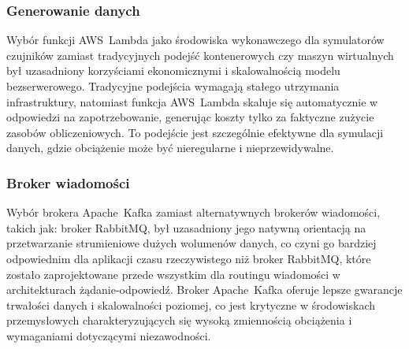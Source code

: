 \subsubsection{Generowanie danych}

Wybór funkcji \mbox{AWS Lambda} \cite{aws_lambda_docs} jako środowiska wykonawczego dla symulatorów czujników zamiast tradycyjnych podejść kontenerowych czy maszyn wirtualnych był uzasadniony korzyściami ekonomicznymi i skalowalnością modelu bezserwerowego. Tradycyjne podejścia wymagają stałego utrzymania infrastruktury, natomiast funkcja \mbox{AWS Lambda} skaluje się automatycznie w odpowiedzi na zapotrzebowanie, generując koszty tylko za faktyczne zużycie zasobów obliczeniowych. To podejście jest szczególnie efektywne dla symulacji danych, gdzie obciążenie może być nieregularne i nieprzewidywalne.

\subsubsection{Broker wiadomości}

Wybór brokera \mbox{Apache Kafka} \cite{kafka} zamiast alternatywnych brokerów wiadomości, takich jak: broker \mbox{RabbitMQ}, był uzasadniony jego natywną orientacją na przetwarzanie strumieniowe dużych wolumenów danych, co czyni go bardziej odpowiednim dla aplikacji czasu rzeczywistego niż broker \mbox{RabbitMQ}, które zostało zaprojektowane przede wszystkim dla routingu wiadomości w architekturach żądanie-odpowiedź.  Broker \mbox{Apache Kafka} oferuje lepsze gwarancje trwałości danych i skalowalności poziomej, co jest krytyczne w środowiskach przemysłowych charakteryzujących się wysoką zmiennością obciążenia i wymaganiami dotyczącymi niezawodności.
